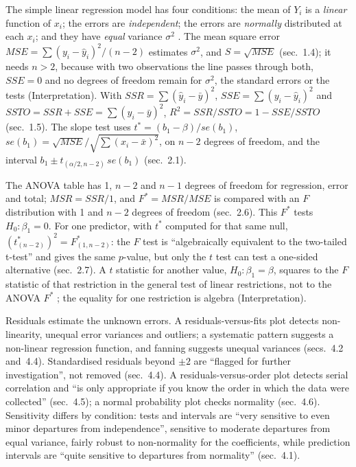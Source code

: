 \begin{qfmethod}[Regression assumptions and diagnostics: what estimation, standard errors and exact tests each assume, residual plots, the standard error of estimate, $R^2$, coefficient $t$ tests and the simple-regression ANOVA, with $F=t^2$ for a zero slope]\label{meth:regression-diagnostics-anova}
 The simple linear regression model has four conditions: the mean of $Y_i$ is a \emph{linear} function of $x_i$; the errors are \emph{independent}; the errors are \emph{normally} distributed at each $x_i$; and they have \emph{equal} variance $\sigma^2$ \citep[sec.~1.3]{regression-methods-course-notes}. The mean square error $MSE=\sum(y_i-\hat y_i)^2/(n-2)$ estimates $\sigma^2$, and $S=\sqrt{MSE}$ (sec.~1.4); it needs $n>2$, because with two observations the line passes through both, $SSE=0$ and no degrees of freedom remain for $\sigma^2$, the standard errors or the tests (Interpretation). With $SSR=\sum(\hat y_i-\bar y)^2$, $SSE=\sum(y_i-\hat y_i)^2$ and $SSTO=SSR+SSE=\sum(y_i-\bar y)^2$, $R^2=SSR/SSTO=1-SSE/SSTO$ (sec.~1.5). The slope test uses $t^*=(b_1-\beta)/se(b_1)$, $se(b_1)=\sqrt{MSE}/\sqrt{\sum(x_i-\bar x)^2}$, on $n-2$ degrees of freedom, and the interval $b_1\pm t_{(\alpha/2,n-2)}\,se(b_1)$ (sec.~2.1).

The ANOVA table has 1, $n-2$ and $n-1$ degrees of freedom for regression, error and total; $MSR=SSR/1$, and $F^*=MSR/MSE$ is compared with an $F$ distribution with 1 and $n-2$ degrees of freedom (sec.~2.6). This $F^*$ tests $H_0:\beta_1=0$. For one predictor, with $t^*$ computed for that same null, $(t^*_{(n-2)})^2=F^*_{(1,n-2)}$: the $F$ test is ``algebraically equivalent to the two-tailed t-test'' and gives the same $p$-value, but only the $t$ test can test a one-sided alternative (sec.~2.7). A $t$ statistic for another value, $H_0:\beta_1=\beta$, squares to the $F$ statistic of that restriction in the general test of linear restrictions, not to the ANOVA $F^*$ \citep[Linear regression -- hypothesis testing, ``Test of a restriction on a single coefficient (t test)'' and ``Test of a set of linear restrictions (F test)'']{linear-regression-lectures}; the equality for one restriction is algebra (Interpretation).

Residuals estimate the unknown errors. A residuals-versus-fits plot detects non-linearity, unequal error variances and outliers; a systematic pattern suggests a non-linear regression function, and fanning suggests unequal variances (secs.~4.2 and~4.4). Standardised residuals beyond $\pm2$ are ``flagged for further investigation'', not removed (sec.~4.4). A residuals-versus-order plot detects serial correlation and ``is only appropriate if you know the order in which the data were collected'' (sec.~4.5); a normal probability plot checks normality (sec.~4.6). Sensitivity differs by condition: tests and intervals are ``very sensitive to even minor departures from independence'', sensitive to moderate departures from equal variance, fairly robust to non-normality for the coefficients, while prediction intervals are ``quite sensitive to departures from normality'' (sec.~4.1).


\end{qfmethod}
